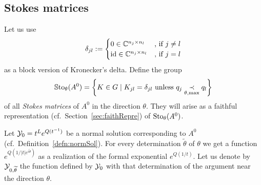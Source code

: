 \subsection{Stokes matrices}\label{sec:matrixReps}
\begin{defn}\label{defn:groupOfFaithfullReps}
  Let us use
  \[
    \delta_{jl}:=
    \begin{cases}
      0 \in \mathbb{C}^{n_j\times n_l} & \text{,~if~} j\neq l
    \\\operatorname{id} \in \mathbb{C}^{n_j\times n_l} & \text{,~if~} j=l
    \end{cases}
  \]
  as a block version of Kronecker's delta.
  Define the group
  \[
    \operatorname{\mathbb{S}to}_\theta(A^0)= \left\{K\in G\mid K_{jl}=\delta_{jl} \text{ unless }
      q_j \underset{\theta,\max}{\prec} q_l \right\}
  \]
  of all \emph{Stokes matrices} of $A^0$ in the direction $\theta$.
  They will arise as a faithful representation
  (cf.\ Section~\ref{sec:faithRepre}) of $\operatorname{Sto}_\theta(A^0)$.
\end{defn}
Let $\mathcal{Y}_0=t^L e^{Q(t^{-1})}$ be a normal solution corresponding to
$A^0$ (cf.\ Definition~\ref{defn:normSol}).
For every determination $\tilde\theta$ of $\theta$ we
get a function $e^{Q(1/|t|e^{i\tilde\theta})}$ as a realization of the formal
exponential $e^{Q(1/t)}$.
Let us denote by $\mathcal{Y}_{0,\widetilde\theta}$ the function defined by $\mathcal{Y}_0$ with
that determination of the argument near the direction
$\theta$.\label{page:alreadyUsedDefn}

